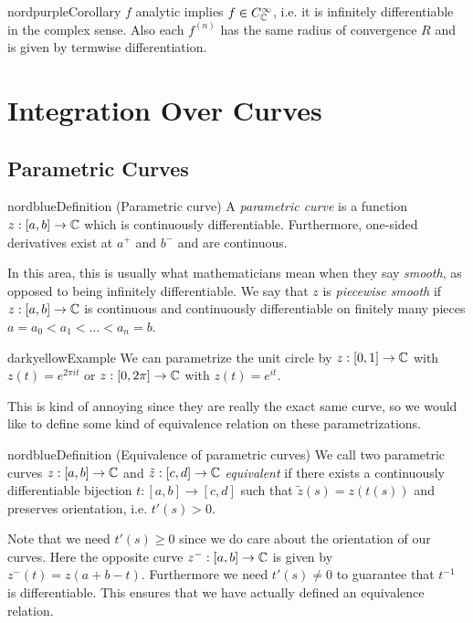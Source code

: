 \begin{mybox}{nordpurple}{Corollary}
  $f$ analytic implies $f \in C^\infty_{\mathbb{C}}$, i.e. it is
  infinitely differentiable in the complex sense. Also
  each $f^{(n)}$ has the same radius of convergence $R$
  and is given by termwise differentiation.
\end{mybox}

\pagebreak
\section{Integration Over Curves}

\subsection{Parametric Curves}
\begin{mybox}{nordblue}{Definition (Parametric curve)}
  A \textit{parametric curve} is a function
  $z : [a, b] \to \mathbb{C}$ which is continuously
  differentiable. Furthermore, one-sided
  derivatives exist at $a^+$ and $b^-$ and are continuous.
\end{mybox}

In this area, this is usually what mathematicians
mean when they say \textit{smooth}, as opposed to being
infinitely differentiable. We say that $z$ is
\textit{piecewise smooth} if $z : [a, b] \to \mathbb{C}$
is continuous and continuously differentiable on
finitely many pieces $a = a_0 < a_1 < \dots < a_n = b$.

\begin{mybox}{darkyellow}{Example}
  We can parametrize the unit circle by
  $z : [0, 1] \to \mathbb{C}$ with
  $z(t) = e^{2\pi it}$ or
  $z : [0, 2\pi] \to \mathbb{C}$ with
  $z(t) = e^{it}$.
\end{mybox}

This is kind of annoying since they are really the
exact same curve, so we would like to define some
kind of equivalence relation on these parametrizations.

\begin{mybox}{nordblue}{Definition (Equivalence of parametric curves)}
  We call two parametric curves $z : [a, b] \to \mathbb{C}$ and
  $\tilde{z} : [c, d] \to \mathbb{C}$ \textit{equivalent} if
  there exists a continuously differentiable bijection
  $t : [a, b] \to [c, d]$ such that
  $\tilde{z}(s) = z(t(s))$ and preserves orientation,
  i.e. $t'(s) > 0$.
\end{mybox}

Note that we need $t'(s) \ge 0$ since we do care about
the orientation of our curves.
Here the opposite curve $z^- : [a, b] \to \mathbb{C}$ is given by
$z^-(t) = z(a + b - t)$. Furthermore we need
$t'(s) \ne 0$ to guarantee that $t^{-1}$ is
differentiable. This ensures that we have actually
defined an equivalence relation.

